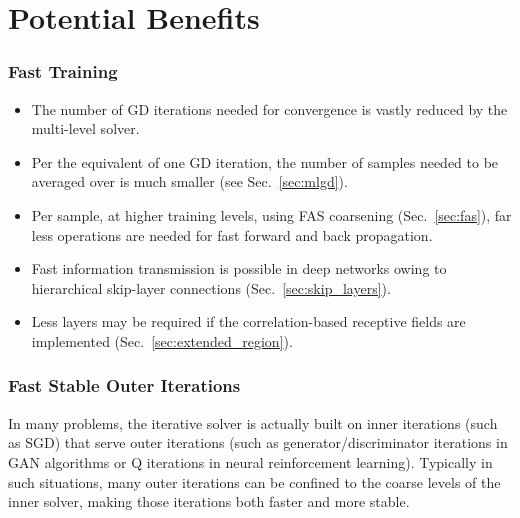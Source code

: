\documentclass{article} %
\begin{document}

\newpage
\part{Potential Benefits}
\label{sec:benefits}

\section{Fast Training}
\label{sec:fast_training}
\begin{itemize}
\item The number of GD iterations needed for convergence is vastly reduced by the multi-level solver.
\item Per the equivalent of one GD iteration, the number of samples needed to be averaged over is much smaller (see Sec.~\ref{sec:mlgd}).
\item Per sample, at higher training levels, using FAS coarsening (Sec.~\ref{sec:fas}), far less operations are needed for fast forward and back propagation.
\item Fast information transmission is possible in deep networks owing to hierarchical skip-layer connections (Sec.~\ref{sec:skip_layers}).
\item Less layers may be required if the correlation-based receptive fields are implemented (Sec.~\ref{sec:extended_region}).
\end{itemize}

\section{Fast Stable Outer Iterations}
\label{sec:out_iteration}
In many problems, the iterative solver is actually built on inner iterations (such as SGD) that serve outer iterations (such as generator/discriminator iterations in GAN algorithms or Q iterations in neural reinforcement learning). Typically in such situations, many outer iterations can be confined to the coarse levels of the inner solver, making those iterations both faster and more stable.
\end{document}
